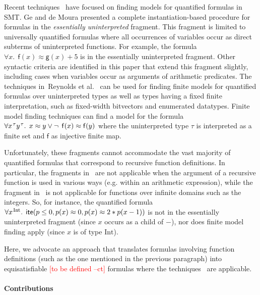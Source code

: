 \documentclass[runningheads,a4paper]{llncs}
\newcommand{\con}[1]{\mathsf{#1}}
\let\oldneg=\neg
\def\neg{\oldneg\:}
\newcommand{\teq}{\approx}
\newcommand{\sortint}{\mathrm{Int}}
\newcommand{\lite}{\con{ite}}
\newcommand{\rem}[1]{\textcolor{red}{[#1]}}
\newcommand{\ct}[1]{\rem{#1 --ct}}
\newcommand{\vthinspace}{\kern+0.083333em}
\newcommand{\typ}[1]{^{\vthinspace #1}}
\begin{document}
Recent techniques~\cite{GeDeM-CAV-09, ReyEtAl-1-RR-13} 
have focused on finding models for quantified formulas in SMT.
Ge and de Moura \cite{GeDeM-CAV-09} presented a complete instantiation-based
procedure for formulas in the \emph{essentially uninterpreted} fragment.
This fragment is limited to universally quantified formulas where all
occurrences of variables occur as direct subterms of uninterpreted
functions. For example, the formula $\forall x%
.\;\, \con{f}( x )
\teq \con{g}( x ) + 5$ is in the essentially uninterpreted fragment.
Other syntactic criteria are identified in this paper that extend
this fragment slightly, including cases when variables occur as arguments of
arithmetic predicates. The techniques in~Reynolds et al.\
\cite{ReyEtAl-1-RR-13} can be used for finding finite models for quantified
formulas over uninterpreted types as well as types having a fixed finite
interpretation, such as fixed-width bitvectors and enumerated datatypes.
Finite model finding techniques can
find a model for the formula $\forall x\typ{\tau} y\typ{\tau}.\;\, x \teq
y \vee \neg \con{f}( x ) \teq \con{f}( y )$ where the uninterpreted type $\tau$ is
interpreted as a finite set and $\con{f}$ as injective finite map.

Unfortunately, these fragments cannot accommodate the vast majority of
quantified formulas that correspond to recursive function definitions.
In particular, the fragments in~\cite{GeDeM-CAV-09} are not applicable when the argument of a recursive function is used in various ways (e.g. within an arithmetic expression), 
while the fragment in~\cite{ReyEtAl-1-RR-13} is not applicable for functions over infinite domains such as the integers.
So, for instance, the quantified formula $\forall x\typ{\sortint}.\;\, \lite( p \leq 0, p( x ) \teq 0, p( x ) \teq 2 * p( x - 1 ) )$ 
is not in the essentially uninterpreted fragment (since $x$ occurs as a child of $-$),
nor does finite model finding apply (since $x$ is of type $\sortint$).

Here, we advocate an approach that translates formulas involving function
definitions (such as the one mentioned in the previous paragraph)
into equisatisfiable \ct{to be defined} formulas where the
techniques~\cite{GeDeM-CAV-09, ReyEtAl-1-RR-13} are applicable.

\paragraph{Contributions}
\end{document}

